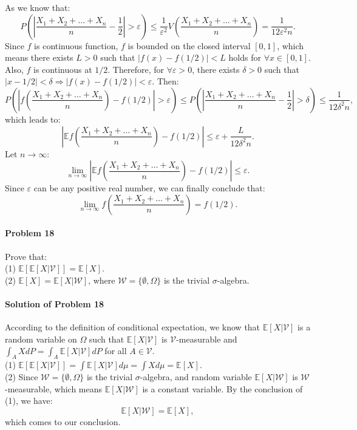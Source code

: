 \documentclass{article}
\begin{document}
As we know that:
\[P\left(\left|\frac{X_1+X_2+\ldots+X_n}{n}-\frac12\right|>\varepsilon\right)\leqslant \frac{1}{\varepsilon^2}V\left(\frac{X_1+X_2+\ldots+X_n}{n}\right)=\frac{1}{12\varepsilon^2 n}.\]
Since $f$ is continuous function, $f$ is bounded on the closed interval $[0,1]$, which means there exists $L>0$ such that $|f(x)-f(1/2)|<L$ holds for $\forall x\in [0,1]$. Also, $f$ is continuous at $1/2$. Therefore, for $\forall \varepsilon > 0$, there exists $\delta > 0$ such that $|x-1/2|<\delta\Rightarrow |f(x)-f(1/2)|<\varepsilon$. Then:
\[P\left(\left|f\left(\frac{X_1+X_2+\ldots+X_n}{n}\right)-f(1/2)\right|>\varepsilon\right)\leqslant P\left(\left|\frac{X_1+X_2+\ldots+X_n}{n}-\frac12\right|>\delta\right)\leqslant \frac{1}{12\delta^2 n},\]
which leads to:
\[\left|\mathbb{E}f\left(\frac{X_1+X_2+\ldots+X_n}{n}\right) -f(1/2)\right|\leqslant \varepsilon + \frac{L}{12\delta^2 n}.\]
Let $n\rightarrow\infty$:
\[\lim_{n\rightarrow\infty}\left|\mathbb{E}f\left(\frac{X_1+X_2+\ldots+X_n}{n}\right)-f(1/2)\right|\leqslant \varepsilon.\]
Since $\varepsilon$ can be any positive real number, we can finally conclude that:
\[\lim_{n\rightarrow\infty}f\left(\frac{X_1+X_2+\ldots+X_n}{n}\right)=f(1/2).\]

\paragraph{Problem 18} Prove that:\\
(1) $\mathbb{E}[\mathbb{E}[X|\mathcal V]]=\mathbb{E}[X]$.\\
(2) $\mathbb{E}[X] = \mathbb{E}[X|\mathcal W]$, where $\mathcal W = \{\emptyset, \Omega\}$ is the trivial $\sigma$-algebra. 

\paragraph{Solution of Problem 18} According to the definition of conditional expectation, we know that $\mathbb{E}[X|\mathcal V]$ is a random variable on $\Omega$ such that $\mathbb{E}[X|\mathcal V]$ is $\mathcal V$-measurable and $\int_A XdP = \int_A \mathbb{E}[X|\mathcal V]dP$ for all $A\in\mathcal V$.\\
(1) $\mathbb{E}[\mathbb{E}[X|\mathcal V]] = \int \mathbb{E}[X|\mathcal V] d\mu = \int Xd\mu = \mathbb{E}[X]$.\\
(2) Since $\mathcal W=\{\emptyset, \Omega\}$ is the trivial $\sigma$-algebra, and random variable $\mathbb{E}[X|\mathcal W]$ is $\mathcal W$-measurable, which means $\mathbb{E}[X|\mathcal W]$ is a constant variable. By the conclusion of (1), we have:
\[\mathbb{E}[X|\mathcal W]=\mathbb{E}[X],\]
which comes to our conclusion. 
\end{document}

